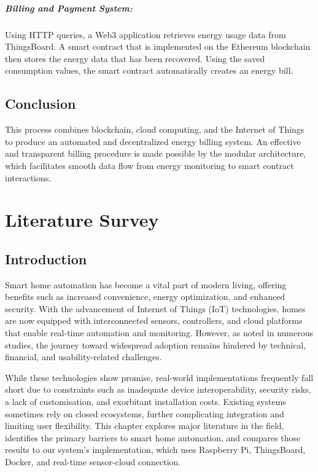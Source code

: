 \documentclass[a4paper,12pt]{report}
\begin{document}
\paragraph{Billing and Payment System:} Using HTTP queries, a Web3 application retrieves energy usage data from ThingsBoard. A smart contract that is implemented on the Ethereum blockchain then stores the energy data that has been recovered. Using the saved consumption values, the smart contract automatically creates an energy bill.

\section{Conclusion}

This process combines blockchain, cloud computing, and the Internet of Things to produce an automated and decentralized energy billing system. An effective and transparent billing procedure is made possible by the modular architecture, which facilitates smooth data flow from energy monitoring to smart contract interactions.

\chapter{Literature Survey}

\section{Introduction}
Smart home automation has become a vital part of modern living, offering benefits such as increased convenience, energy optimization, and enhanced security. With the advancement of Internet of Things (IoT) technologies, homes are now equipped with interconnected sensors, controllers, and cloud platforms that enable real-time automation and monitoring. However, as noted in numerous studies, the journey toward widespread adoption remains hindered by technical, financial, and usability-related challenges\cite{Zhang2022TheCS}\cite{Ahmed02102021}.

While these technologies show promise, real-world implementations frequently fall short due to constraints such as inadequate device interoperability, security risks, a lack of customisation, and exorbitant installation costs.  Existing systems sometimes rely on closed ecosystems, further complicating integration and limiting user flexibility.  This chapter explores major literature in the field, identifies the primary barriers to smart home automation, and compares those results to our system's implementation, which uses Raspberry Pi, ThingsBoard, Docker, and real-time sensor-cloud connection.
\end{document}
